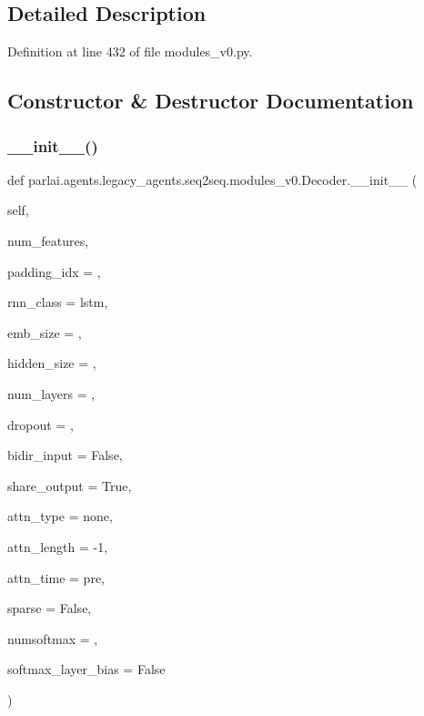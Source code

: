 

\subsection{Detailed Description}


Definition at line 432 of file modules\+\_\+v0.\+py.



\subsection{Constructor \& Destructor Documentation}
\mbox{\label{classparlai_1_1agents_1_1legacy__agents_1_1seq2seq_1_1modules__v0_1_1Decoder_a96b70aa2702cbca1322750098d236659}} 
\subsubsection{\texorpdfstring{\+\_\+\+\_\+init\+\_\+\+\_\+()}{\_\_init\_\_()}}
{\footnotesize\ttfamily def parlai.\+agents.\+legacy\+\_\+agents.\+seq2seq.\+modules\+\_\+v0.\+Decoder.\+\_\+\+\_\+init\+\_\+\+\_\+ (\begin{DoxyParamCaption}\item[{}]{self,  }\item[{}]{num\+\_\+features,  }\item[{}]{padding\+\_\+idx = {},  }\item[{}]{rnn\+\_\+class = {\ttfamily \textquotesingle{}lstm\textquotesingle{}},  }\item[{}]{emb\+\_\+size = {},  }\item[{}]{hidden\+\_\+size = {},  }\item[{}]{num\+\_\+layers = {},  }\item[{}]{dropout = {},  }\item[{}]{bidir\+\_\+input = {\ttfamily False},  }\item[{}]{share\+\_\+output = {\ttfamily True},  }\item[{}]{attn\+\_\+type = {\ttfamily \textquotesingle{}none\textquotesingle{}},  }\item[{}]{attn\+\_\+length = {\ttfamily -\/1},  }\item[{}]{attn\+\_\+time = {\ttfamily \textquotesingle{}pre\textquotesingle{}},  }\item[{}]{sparse = {\ttfamily False},  }\item[{}]{numsoftmax = {},  }\item[{}]{softmax\+\_\+layer\+\_\+bias = {\ttfamily False} }\end{DoxyParamCaption})}



